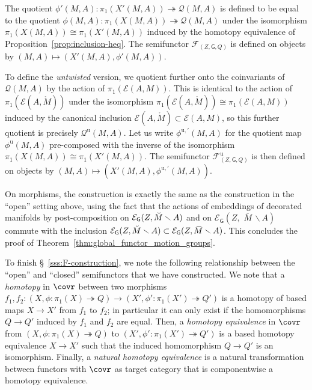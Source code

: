 \documentclass[AHL,Unicode,published]{cedram}
\newcommand{\Int}{\mathring}
\newcommand{\unt}{\mathrm{u}}
\newcommand{\mbar}{\ensuremath{{\,\,\overline{\!\! M\!}\,}}}
\newcommand{\sG}{\mathsf{G}}
\newcommand{\cE}{\mathcal{E}}
\newcommand{\cF}{\mathcal{F}}
\newcommand{\cQ}{\mathcal{Q}}
\begin{document}
The quotient $\phi'(M,A) \colon \pi_{1}(X'(M,A)) \twoheadrightarrow \cQ(M,A)$ is defined to be equal to the quotient $\phi(M,A) \colon \pi_{1}(X(M,A)) \twoheadrightarrow \cQ(M,A)$ under the isomorphism $\pi_{1}(X(M,A)) \cong \pi_{1}(X'(M,A))$ induced by the homotopy equivalence of Proposition~\ref{prop:inclusion-heq}. The semifunctor $\cF_{(Z,\sG,Q)}$ is defined on objects by $(M,A) \mapsto (X'(M,A),\phi'(M,A))$.

To define the \emph{untwisted} version, we quotient further onto the coinvariants of $\cQ(M,A)$ by the action of $\pi_{1}(\cE(A,M))$. This is identical to the action of $\pi_{1}(\cE(A,\Int{M}))$ under the isomorphism $\pi_{1}(\cE(A,\Int{M})) \cong \pi_{1}(\cE(A,M))$ induced by the canonical inclusion $\cE(A,\Int{M}) \subset \cE(A,M)$, so this further quotient is precisely $\cQ^{\unt}(M,A)$. Let us write $\phi^{\unt,\prime}(M,A)$ for the quotient map $\phi^{\unt}(M,A)$ pre-composed with the inverse of the isomorphism $\pi_{1}(X(M,A)) \cong \pi_{1}(X'(M,A))$. The semifunctor $\cF^{\unt}_{(Z,\sG,Q)}$ is then defined on objects by $(M,A) \mapsto (X'(M,A),\phi^{\unt,\prime}(M,A))$.

On morphisms, the construction is exactly the same as the construction in the ``open'' setting above, using the fact that the actions of embeddings of decorated manifolds by post-composition on $\cE_{\sG}(Z,\Breve{M} \smallsetminus A)$ and on $\cE_{\sG}(Z,\mbar \smallsetminus A)$ commute with the inclusion $\cE_{\sG}(Z,\Breve{M} \smallsetminus A) \subset \cE_{\sG}(Z,\mbar \smallsetminus A)$. This concludes the proof of Theorem~\ref{thm:global_functor_motion_groups}.

To finish \S~\ref{sss:F-construction}, we note the following relationship between the ``open'' and ``closed'' semifunctors that we have constructed. We note that a \emph{homotopy} in $\covr$ between two morphisms $f_{1},f_{2} \colon (X,\phi \colon \pi_{1}(X) \twoheadrightarrow Q) \to (X',\phi' \colon \pi_{1}(X') \twoheadrightarrow Q')$ is a homotopy of based maps $X \to X'$ from $f_{1}$ to $f_{2}$; in particular it can only exist if the homomorphisms $Q \to Q'$ induced by $f_{1}$ and $f_{2}$ are equal. Then, a \emph{homotopy equivalence} in $\covr$ from $(X,\phi \colon \pi_{1}(X) \twoheadrightarrow Q)$ to $(X',\phi' \colon \pi_{1}(X') \twoheadrightarrow Q')$ is a based homotopy equivalence $X \to X'$ such that the induced homomorphism $Q \to Q'$ is an isomorphism. Finally, a \emph{natural homotopy equivalence} is a natural transformation between functors with $\covr$ as target category that is componentwise a homotopy equivalence.
\end{document}
